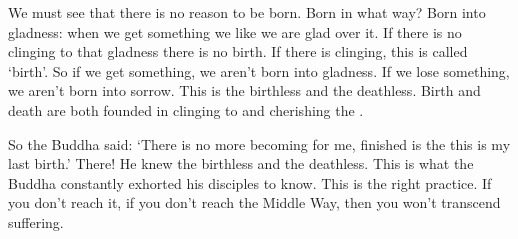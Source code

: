 We must see that there is no reason to be born. Born in what way? Born into gladness: when we get something we like we are glad over it. If there is no clinging to that gladness there is no birth. If there is clinging, this is called `birth'. So if we get something, we aren't born into gladness. If we lose something, we aren't born into sorrow. This is the birthless  and the deathless. Birth and death are both founded in clinging to and cherishing the . 

So the Buddha said: `There is no more becoming for me, finished is the  this is my last birth.' There! He knew the birthless and the deathless. This is what the Buddha constantly exhorted his disciples to know. This is the right practice. If you don't reach it, if you don't reach the Middle Way, then you won't transcend suffering. 

